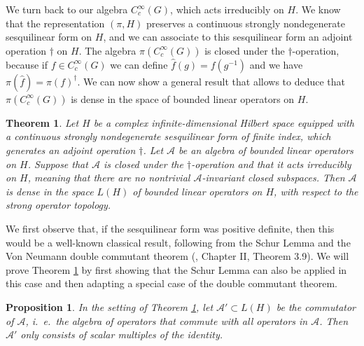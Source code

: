 \documentclass{article}
\theoremstyle{definition}
\theoremstyle{remark}
\theoremstyle{plain}
\newtheorem{prp}[dfn]{Proposition}
\newtheorem{thm}[dfn]{Theorem}
\begin{document}
We turn back to our algebra $C_c^{\infty}(G)$, which acts irreducibly on $H$. We know that the representation $(\pi,H)$ preserves a continuous strongly nondegenerate sesquilinear form on $H$, and we can associate to this sesquilinear form an adjoint operation $\dag$ on $H$. The algebra $\pi(C_c^\infty(G))$ is closed under the $\dag$-operation, because if $f\in C_c^{\infty}(G)$ we can define $\hat{f}(g)=f(g^{-1})$ and we have $\pi(\hat{f})=\pi(f)^\dag$. We can now show a general result that allows to deduce that $\pi(C_c^\infty(G))$ is dense in the space of bounded linear operators on $H$. \\

\begin{thm} \label{dense}
    Let $H$ be a complex infinite-dimensional Hilbert space equipped with a continuous strongly nondegenerate sesquilinear form of finite index, which generates an adjoint operation $\dag$. Let $\mathcal{A}$ be an algebra of bounded linear operators on $H$. Suppose that $\mathcal{A}$ is closed under the $\dag$-operation and that it acts irreducibly on $H$, meaning that there are no nontrivial $\mathcal{A}$-invariant closed subspaces. Then $\mathcal{A}$ is dense in the space $L(H)$ of bounded linear operators on $H$, with respect to the strong operator topology. \\
\end{thm}

We first observe that, if the sesquilinear form was positive definite, then this would be a well-known classical result, following from the Schur Lemma and the Von Neumann double commutant theorem (\cite{takesaki}, Chapter II, Theorem 3.9). We will prove Theorem \ref{dense} by first showing that the Schur Lemma can also be applied in this case and then adapting a special case of the double commutant theorem. \\

\begin{prp}
    In the setting of Theorem \ref{dense}, let $\mathcal{A}'\subset L(H)$ be the commutator of $\mathcal{A}$, i.~e.~the algebra of operators that commute with all operators in $\mathcal{A}$. Then $\mathcal{A}'$ only consists of scalar multiples of the identity.
\end{prp}
\end{document}
